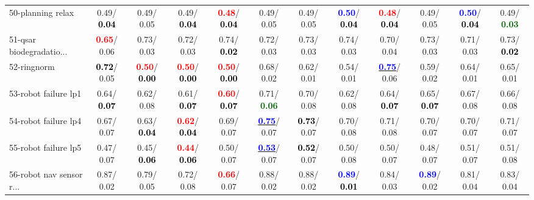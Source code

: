 \begin{table}[h]
\begin{center}
{\begin{tabular}{lc|c|c|c|c|c|c|c|c|c|c}
50-planning relax &   0.49/\textcolor{black}{\textbf{  0.04}} &   0.49/  0.05 &   0.49/\textcolor{black}{\textbf{  0.04}} & \textcolor{red}{\textbf{  0.48}}/\textcolor{black}{\textbf{  0.04}} &   0.49/  0.05 &   0.49/  0.05 & \textcolor{blue}{\textbf{  0.50}}/\textcolor{black}{\textbf{  0.04}} & \textcolor{red}{\textbf{  0.48}}/\textcolor{black}{\textbf{  0.04}} &   0.49/  0.05 & \textcolor{blue}{\textbf{  0.50}}/\textcolor{black}{\textbf{  0.04}} &   0.49/\textcolor{darkgreen}{\textbf{  0.03}} \\
51-qsar biodegradatio... & \textcolor{red}{\textbf{  0.65}}/  0.06 &   0.73/  0.03 &   0.72/  0.03 &   0.74/\textcolor{black}{\textbf{  0.02}} &   0.72/  0.03 &   0.73/  0.03 &   0.74/  0.03 &   0.70/  0.04 &   0.73/  0.03 &   0.71/  0.03 &   0.73/\textcolor{black}{\textbf{  0.02}} \\
52-ringnorm & \textcolor{black}{\textbf{  0.72}}/  0.05 & \textcolor{red}{\textbf{  0.50}}/\textcolor{black}{\textbf{  0.00}} & \textcolor{red}{\textbf{  0.50}}/\textcolor{black}{\textbf{  0.00}} & \textcolor{red}{\textbf{  0.50}}/\textcolor{black}{\textbf{  0.00}} &   0.68/  0.02 &   0.62/  0.01 &   0.54/  0.01 & \underline{\textcolor{blue}{\textbf{  0.75}}}/  0.06 &   0.59/  0.02 &   0.64/  0.01 &   0.65/  0.01 \\
53-robot failure lp1 &   0.64/\textcolor{black}{\textbf{  0.07}} &   0.62/  0.08 &   0.61/\textcolor{black}{\textbf{  0.07}} & \textcolor{red}{\textbf{  0.60}}/\textcolor{black}{\textbf{  0.07}} &   0.71/\textcolor{darkgreen}{\textbf{  0.06}} &   0.70/  0.08 &   0.62/  0.08 &   0.64/\textcolor{black}{\textbf{  0.07}} &   0.65/\textcolor{black}{\textbf{  0.07}} &   0.67/  0.08 &   0.66/  0.08 \\ \hline
54-robot failure lp4 &   0.67/  0.07 &   0.63/\textcolor{black}{\textbf{  0.04}} & \textcolor{red}{\textbf{  0.62}}/\textcolor{black}{\textbf{  0.04}} &   0.69/  0.07 & \underline{\textcolor{blue}{\textbf{  0.75}}}/  0.07 & \textcolor{black}{\textbf{  0.73}}/  0.07 &   0.70/  0.08 &   0.71/  0.08 &   0.70/  0.07 &   0.70/  0.07 &   0.71/  0.07 \\
55-robot failure lp5 &   0.47/  0.07 &   0.45/\textcolor{black}{\textbf{  0.06}} & \textcolor{red}{\textbf{  0.44}}/\textcolor{black}{\textbf{  0.06}} &   0.50/  0.07 & \underline{\textcolor{blue}{\textbf{  0.53}}}/  0.07 & \textcolor{black}{\textbf{  0.52}}/  0.07 &   0.50/  0.08 &   0.50/  0.07 &   0.48/  0.07 &   0.51/  0.07 &   0.51/  0.08 \\
56-robot nav sensor r... &   0.87/  0.02 &   0.79/  0.05 &   0.72/  0.08 & \textcolor{red}{\textbf{  0.66}}/  0.07 &   0.88/  0.02 &   0.88/  0.02 & \textcolor{blue}{\textbf{  0.89}}/\textcolor{black}{\textbf{  0.01}} &   0.84/  0.03 & \textcolor{blue}{\textbf{  0.89}}/  0.02 &   0.81/  0.04 &   0.83/  0.04 \\

\end{tabular}}
\end{center}
\end{table}
